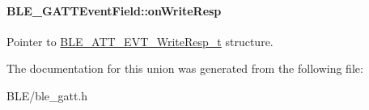 \paragraph[{\texorpdfstring{on\+Write\+Resp}{onWriteResp}}]{ B\+L\+E\+\_\+\+G\+A\+T\+T\+Event\+Field\+::on\+Write\+Resp}\hypertarget{union_b_l_e___g_a_t_t_event_field_a424b08ab9437012e89570fde2be1b907}{}\label{union_b_l_e___g_a_t_t_event_field_a424b08ab9437012e89570fde2be1b907}
Pointer to \hyperlink{struct_b_l_e___a_t_t___e_v_t___write_resp__t}{B\+L\+E\+\_\+\+A\+T\+T\+\_\+\+E\+V\+T\+\_\+\+Write\+Resp\+\_\+t} structure. 

The documentation for this union was generated from the following file\+:\begin{DoxyCompactItemize}
\item 
B\+L\+E/ble\+\_\+gatt.\+h\end{DoxyCompactItemize}
